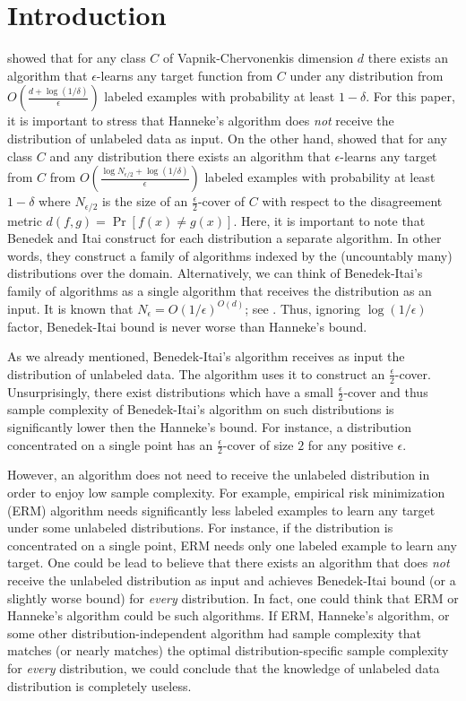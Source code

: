 \section{Introduction}
\label{section:introduction}

\citet{Hanneke-2016} showed that for any class $C$ of Vapnik-Chervonenkis
dimension $d$ there exists an algorithm that $\epsilon$-learns any target
function from $C$ under any distribution from $O\left(\frac{d +
\log(1/\delta)}{\epsilon}\right)$ labeled examples with probability at least
$1-\delta$. For this paper, it is important to stress that Hanneke's algorithm
does \emph{not} receive the distribution of unlabeled data as input. On the
other hand, \citet{Benedek-Itai-1991} showed that for any class $C$ and any
distribution there exists an algorithm that $\epsilon$-learns any target from
$C$ from $O \left( \frac{\log N_{\epsilon/2} + \log
(1/\delta)}{\epsilon}\right)$ labeled examples with probability at least
$1-\delta$ where $N_{\epsilon/2}$ is the size of an $\frac{\epsilon}{2}$-cover
of $C$ with respect to the disagreement metric $d(f,g) = \Pr[f(x) \neq g(x)]$.
Here, it is important to note that Benedek and Itai construct for each
distribution a separate algorithm. In other words, they construct a family of
algorithms indexed by the (uncountably many) distributions over the domain.
Alternatively, we can think of Benedek-Itai's family of algorithms as a single
algorithm that receives the distribution as an input. It is known that
$N_\epsilon = O(1/\epsilon)^{O(d)}$; see \citet{Dudley-1978}. Thus, ignoring
$\log(1/\epsilon)$ factor, Benedek-Itai bound is never worse than Hanneke's
bound.

As we already mentioned, Benedek-Itai's algorithm receives as input the
distribution of unlabeled data. The algorithm uses it to construct an
$\frac{\epsilon}{2}$-cover. Unsurprisingly, there exist distributions which have
a small $\frac{\epsilon}{2}$-cover and thus sample complexity of Benedek-Itai's
algorithm on such distributions is significantly lower then the Hanneke's bound.
For instance, a distribution concentrated on a single point has an
$\frac{\epsilon}{2}$-cover of size $2$ for any positive $\epsilon$.

However, an algorithm does not need to receive the unlabeled distribution in
order to enjoy low sample complexity. For example, empirical risk minimization
(ERM) algorithm needs significantly less labeled examples to learn any target
under some unlabeled distributions. For instance, if the distribution is
concentrated on a single point, ERM needs only one labeled example to learn any
target. One could be lead to believe that there exists an algorithm that does
\emph{not} receive the unlabeled distribution as input and achieves Benedek-Itai
bound (or a slightly worse bound) for \emph{every} distribution. In fact, one
could think that ERM or Hanneke's algorithm could be such algorithms. If ERM,
Hanneke's algorithm, or some other distribution-independent algorithm had sample
complexity that matches (or nearly matches) the optimal distribution-specific
sample complexity for \emph{every} distribution, we could conclude that the
knowledge of unlabeled data distribution is completely useless.

